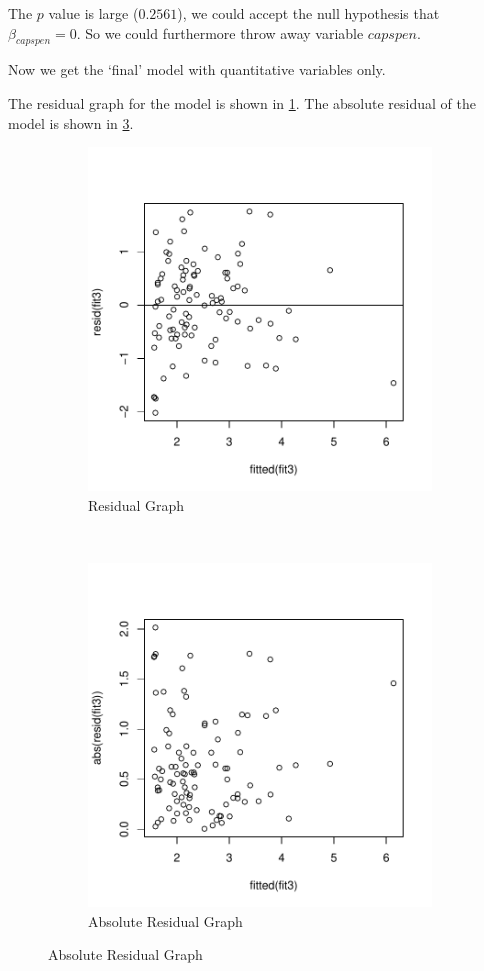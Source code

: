 \documentclass[12pt,letterpaper,titlepage,en-US]{article}
\begin{document}
The $p$ value is large ($0.2561$), we could accept the null hypothesis that $\beta_{capspen} = 0$. So we could furthermore throw away variable $capspen$.

Now we get the `final' model with quantitative variables only.
\pagebreak

The residual graph for the model is shown in \cref{rgmq}.
The absolute residual of the model is shown in \cref{abrgmq}.
\begin{figure}[H]
    \centering
    \begin{subfigure}[t]{0.5\textwidth}
        \centering
        \caption{Residual Graph}\label{rgmq}
        \includegraphics[width=.95\textwidth]{fig/residualplotfit3.pdf}
    \end{subfigure}%
    ~
    \begin{subfigure}[t]{0.5\textwidth}
        \centering
        \caption{Absolute Residual Graph}\label{abrgmq}
        \includegraphics[width=.95\textwidth]{fig/plotfit3abu.pdf}

\end{subfigure}
\end{figure}
\end{document}
